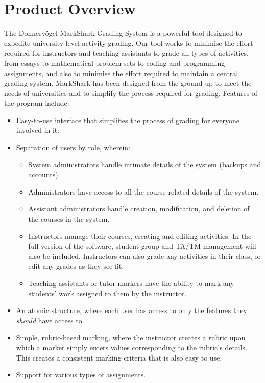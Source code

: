 \documentclass{article}
\begin{document}
\section{Product Overview}  %
The Donnervögel MarkShark Grading System is a powerful tool designed to 
expedite university-level activity grading. Our tool works to minimise the effort 
required for instructors and teaching assistants to grade all types of activities, 
from essays to mathematical problem sets to coding and programming assignments,
and also to minimise the effort required to maintain a central grading system.
MarkShark has been designed from the ground up to meet the needs of universities and 
to simplify the process required for grading. Features of the program include:
\begin{itemize}
  \item Easy-to-use interface that simplifies the process of grading for everyone
    involved in it.
  \item Separation of users by role, wherein:
    \begin{itemize}
      \item System administrators handle intimate details of the system (backups and
	accounts).
      \item Administrators have access to all the course-related details of the system.
      \item Assistant administrators handle creation, modification, and deletion of the
	courses in the system.
      \item Instructors manage their courses, creating and editing activities.
        In the full version of the software, student group and TA/TM management
        will also be included. Instructors can also grade any activities in their
        class, or edit any grades as they see fit.
      \item Teaching assistants or tutor markers have the ability to mark any students'
	work assigned to them by the instructor.
    \end{itemize}
  \item An atomic structure, where each user has access to only the features they 
    \emph{should} have access to.
  \item Simple, rubric-based marking, where the instructor creates a rubric upon which
    a marker simply enters values corresponding to the rubric's details. This creates
    a consistent marking criteria that is also easy to use.
  \item Support for various types of assignments. 

\end{itemize}
\end{document}
